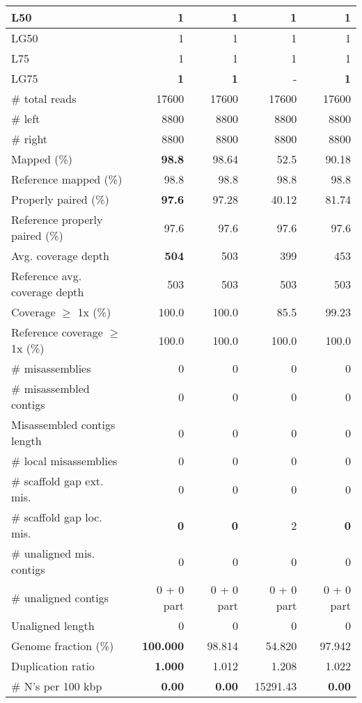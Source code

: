 \documentclass[12pt,a4paper]{article}
\begin{document}
\begin{table}[ht]
\begin{center}
\begin{tabular}{|l*{4}{|r}|}
L50 & 1 & 1 & 1 & 1 \\ \hline
LG50 & 1 & 1 & 1 & 1 \\ \hline
L75 & 1 & 1 & 1 & 1 \\ \hline
LG75 & {\bf 1} & {\bf 1} & - & {\bf 1} \\ \hline
\# total reads & 17600 & 17600 & 17600 & 17600 \\ \hline
\# left & 8800 & 8800 & 8800 & 8800 \\ \hline
\# right & 8800 & 8800 & 8800 & 8800 \\ \hline
Mapped (\%) & {\bf 98.8} & 98.64 & 52.5 & 90.18 \\ \hline
Reference mapped (\%) & 98.8 & 98.8 & 98.8 & 98.8 \\ \hline
Properly paired (\%) & {\bf 97.6} & 97.28 & 40.12 & 81.74 \\ \hline
Reference properly paired (\%) & 97.6 & 97.6 & 97.6 & 97.6 \\ \hline
Avg. coverage depth & {\bf 504} & 503 & 399 & 453 \\ \hline
Reference avg. coverage depth & 503 & 503 & 503 & 503 \\ \hline
Coverage $\geq$ 1x (\%) & 100.0 & 100.0 & 85.5 & 99.23 \\ \hline
Reference coverage $\geq$ 1x (\%) & 100.0 & 100.0 & 100.0 & 100.0 \\ \hline
\# misassemblies & 0 & 0 & 0 & 0 \\ \hline
\# misassembled contigs & 0 & 0 & 0 & 0 \\ \hline
Misassembled contigs length & 0 & 0 & 0 & 0 \\ \hline
\# local misassemblies & 0 & 0 & 0 & 0 \\ \hline
\# scaffold gap ext. mis. & 0 & 0 & 0 & 0 \\ \hline
\# scaffold gap loc. mis. & {\bf 0} & {\bf 0} & 2 & {\bf 0} \\ \hline
\# unaligned mis. contigs & 0 & 0 & 0 & 0 \\ \hline
\# unaligned contigs & 0 + 0 part & 0 + 0 part & 0 + 0 part & 0 + 0 part \\ \hline
Unaligned length & 0 & 0 & 0 & 0 \\ \hline
Genome fraction (\%) & {\bf 100.000} & 98.814 & 54.820 & 97.942 \\ \hline
Duplication ratio & {\bf 1.000} & 1.012 & 1.208 & 1.022 \\ \hline
\# N's per 100 kbp & {\bf 0.00} & {\bf 0.00} & 15291.43 & {\bf 0.00} \\ \hline

\end{tabular}
\end{center}
\end{table}
\end{document}
